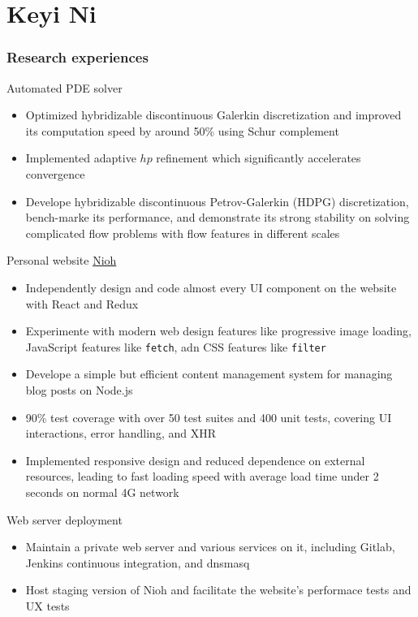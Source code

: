 \documentclass{tccv}
\begin{document}
\part{Keyi Ni}

\section{Research experiences}

\begin{eventlist}
  {Automated PDE solver}
  \begin{itemize}[leftmargin=*]
  \item Optimized hybridizable discontinuous Galerkin discretization and improved its computation speed by around 50\% using Schur complement
  \item Implemented adaptive $hp$ refinement which significantly accelerates convergence
  \item Develope hybridizable discontinuous Petrov-Galerkin (HDPG) discretization, bench-marke its performance, and demonstrate its strong stability on solving complicated flow problems with flow features in different scales
  \end{itemize}
  
  {Personal website \href{https://www.nioh.ca}{Nioh}}
  \begin{itemize}
    \item Independently design and code almost every UI component on the website with React and Redux 
    \item Experimente with modern web design features like progressive image loading, JavaScript features like \texttt{fetch}, adn CSS features like \texttt{filter}
    \item Develope a simple but efficient content management system for managing blog posts on Node.js
    \item 90\% test coverage with over 50 test suites and 400 unit tests, covering UI interactions, error handling, and XHR 
    \item Implemented responsive design and reduced dependence on external resources, leading to fast loading speed with average load time under 2 seconds on normal 4G network
  \end{itemize}

  {Web server deployment}
  \begin{itemize}
    \item Maintain a private web server and various services on it, including Gitlab, Jenkins continuous integration, and dnsmasq 
    \item Host staging version of Nioh and facilitate the website's performace tests and UX tests
  \end{itemize}


\end{eventlist}
\end{document}
